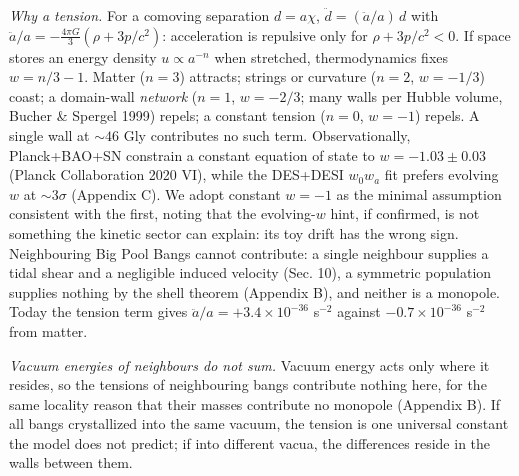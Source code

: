 \documentclass[
  11pt,
]{article}
\begin{document}
\emph{Why a tension.} For a comoving separation \(d = a\chi\),
\(\ddot d = (\ddot a/a)\,d\) with
\(\ddot a/a = -\tfrac{4\pi G}{3}(\rho + 3p/c^2)\): acceleration is
repulsive only for \(\rho + 3p/c^2 < 0\). If space stores an energy
density \(u \propto a^{-n}\) when stretched, thermodynamics fixes
\(w = n/3 - 1\). Matter (\(n=3\)) attracts; strings or curvature
(\(n=2\), \(w=-1/3\)) coast; a domain-wall \emph{network} (\(n=1\),
\(w=-2/3\); many walls per Hubble volume, Bucher \& Spergel 1999)
repels; a constant tension (\(n=0\), \(w=-1\)) repels. A single wall at
\(\sim\!46\) Gly contributes no such term. Observationally,
Planck+BAO+SN constrain a constant equation of state to
\(w = -1.03 \pm 0.03\) (Planck Collaboration 2020 VI), while the
DES+DESI \(w_0w_a\) fit prefers evolving \(w\) at \(\sim\!3\sigma\)
(Appendix C). We adopt constant \(w=-1\) as the minimal assumption
consistent with the first, noting that the evolving-\(w\) hint, if
confirmed, is not something the kinetic sector can explain: its toy
drift has the wrong sign. Neighbouring Big Pool Bangs cannot contribute:
a single neighbour supplies a tidal shear and a negligible induced
velocity (Sec. 10), a symmetric population supplies nothing by the shell
theorem (Appendix B), and neither is a monopole. Today the tension term
gives \(\ddot a/a = +3.4\times10^{-36}\) s\(^{-2}\) against
\(-0.7\times10^{-36}\) s\(^{-2}\) from matter.

\emph{Vacuum energies of neighbours do not sum.} Vacuum energy acts only
where it resides, so the tensions of neighbouring bangs contribute
nothing here, for the same locality reason that their masses contribute
no monopole (Appendix B). If all bangs crystallized into the same
vacuum, the tension is one universal constant the model does not
predict; if into different vacua, the differences reside in the walls
between them.
\end{document}

